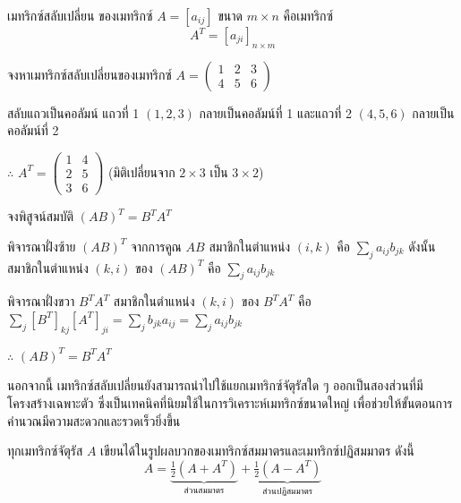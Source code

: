 \begin{definition}
เมทริกซ์สลับเปลี่ยน ของเมทริกซ์ $A = [a_{ij}]$ ขนาด $m \times n$ คือเมทริกซ์
\[ A^T = [a_{ji}]_{n \times m} \]
\end{definition}

\begin{ex}
\label{ex:transpose-basic}
จงหาเมทริกซ์สลับเปลี่ยนของเมทริกซ์ $A = \begin{pmatrix} 1 & 2 & 3 \\ 4 & 5 & 6 \end{pmatrix}$
\end{ex}
\begin{solution}
สลับแถวเป็นคอลัมน์ แถวที่ 1 $(1, 2, 3)$ กลายเป็นคอลัมน์ที่ 1 และแถวที่ 2 $(4, 5, 6)$ กลายเป็นคอลัมน์ที่ 2

$\therefore$ $A^T = \begin{pmatrix} 1 & 4 \\ 2 & 5 \\ 3 & 6 \end{pmatrix}$ (มิติเปลี่ยนจาก $2 \times 3$ เป็น $3 \times 2$) \solhere
\end{solution}

\begin{ex}
\label{ex:transpose-properties}
จงพิสูจน์สมบัติ $(AB)^T = B^T A^T$
\end{ex}
\begin{solution}
พิจารณาฝั่งซ้าย $(AB)^T$ จากการคูณ $AB$ สมาชิกในตำแหน่ง $(i, k)$ คือ $\sum_j a_{ij}b_{jk}$ ดังนั้นสมาชิกในตำแหน่ง $(k, i)$ ของ $(AB)^T$ คือ $\sum_j a_{ij}b_{jk}$

พิจารณาฝั่งขวา $B^T A^T$ สมาชิกในตำแหน่ง $(k, i)$ ของ $B^T A^T$ คือ $\sum_j [B^T]_{kj}[A^T]_{ji} = \sum_j b_{jk} a_{ij} = \sum_j a_{ij}b_{jk}$

$\therefore$ $(AB)^T = B^T A^T$ \solhere
\end{solution}

นอกจากนี้ เมทริกซ์สลับเปลี่ยนยังสามารถนำไปใช้แยกเมทริกซ์จัตุรัสใด ๆ ออกเป็นสองส่วนที่มีโครงสร้างเฉพาะตัว ซึ่งเป็นเทคนิคที่นิยมใช้ในการวิเคราะห์เมทริกซ์ขนาดใหญ่ เพื่อช่วยให้ขั้นตอนการคำนวณมีความสะดวกและรวดเร็วยิ่งขึ้น

\begin{prop}
\label{prop:symmetric-decomposition}
ทุกเมทริกซ์จัตุรัส $A$ เขียนได้ในรูปผลบวกของเมทริกซ์สมมาตรและเมทริกซ์ปฏิสมมาตร ดังนี้
\[ A = \underbrace{\tfrac{1}{2}(A + A^T)}_{\text{ส่วนสมมาตร}} + \underbrace{\tfrac{1}{2}(A - A^T)}_{\text{ส่วนปฏิสมมาตร}} \]
\end{prop}

